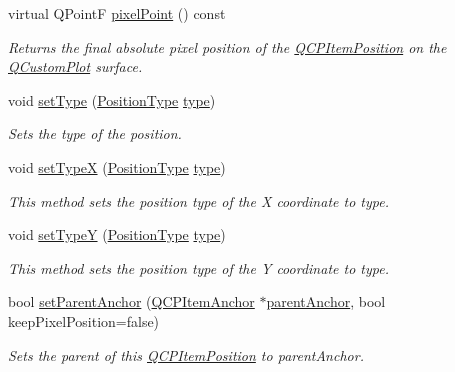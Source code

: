 \begin{DoxyCompactItemize}
\item 
virtual Q\+Point\+F \hyperlink{classQCPItemPosition_ae490f9c76ee2ba33752c495d3b6e8fb5}{pixel\+Point} () const 
\begin{DoxyCompactList}\small\item\em Returns the final absolute pixel position of the \hyperlink{classQCPItemPosition}{Q\+C\+P\+Item\+Position} on the \hyperlink{classQCustomPlot}{Q\+Custom\+Plot} surface. \end{DoxyCompactList}\item 
void \hyperlink{classQCPItemPosition_aa476abf71ed8fa4c537457ebb1a754ad}{set\+Type} (\hyperlink{classQCPItemPosition_aad9936c22bf43e3d358552f6e86dbdc8}{Position\+Type} \hyperlink{classQCPItemPosition_aecb709d72c9aa334a7f62e2c9e0b5d60}{type})
\begin{DoxyCompactList}\small\item\em Sets the type of the position. \end{DoxyCompactList}\item 
void \hyperlink{classQCPItemPosition_a2113b2351d6d00457fb3559a4e20c3ea}{set\+Type\+X} (\hyperlink{classQCPItemPosition_aad9936c22bf43e3d358552f6e86dbdc8}{Position\+Type} \hyperlink{classQCPItemPosition_aecb709d72c9aa334a7f62e2c9e0b5d60}{type})
\begin{DoxyCompactList}\small\item\em This method sets the position type of the X coordinate to {\itshape type}. \end{DoxyCompactList}\item 
void \hyperlink{classQCPItemPosition_ac2a454aa5a54c1615c50686601ec4510}{set\+Type\+Y} (\hyperlink{classQCPItemPosition_aad9936c22bf43e3d358552f6e86dbdc8}{Position\+Type} \hyperlink{classQCPItemPosition_aecb709d72c9aa334a7f62e2c9e0b5d60}{type})
\begin{DoxyCompactList}\small\item\em This method sets the position type of the Y coordinate to {\itshape type}. \end{DoxyCompactList}\item 
bool \hyperlink{classQCPItemPosition_ac094d67a95d2dceafa0d50b9db3a7e51}{set\+Parent\+Anchor} (\hyperlink{classQCPItemAnchor}{Q\+C\+P\+Item\+Anchor} $\ast$\hyperlink{classQCPItemPosition_a7b4ffab9946945c0e11cd2352dc2e042}{parent\+Anchor}, bool keep\+Pixel\+Position=false)
\begin{DoxyCompactList}\small\item\em Sets the parent of this \hyperlink{classQCPItemPosition}{Q\+C\+P\+Item\+Position} to {\itshape parent\+Anchor}. \end{DoxyCompactList}\item 

\end{DoxyCompactItemize}
